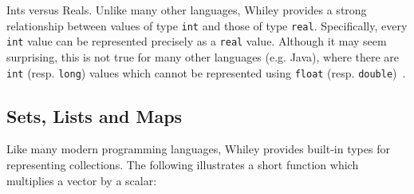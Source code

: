 \begin{insight}{Ints versus Reals.}
Unlike many other languages, Whiley provides a strong relationship
between values of type \lstinline{int} and those of type
\lstinline{real}.  Specifically, every \lstinline{int} value can be
represented precisely as a \lstinline{real} value.  Although it may
seem surprising, this is not true for many other languages
(e.g. Java), where there are \lstinline{int} (resp. \lstinline{long})
values which cannot be represented using \lstinline{float}
(resp. \lstinline{double})~\cite{GJSB05}.
\end{insight}


\newpage
\subsection{Sets, Lists and Maps}
\label{walkthrough_collections}
Like many modern programming languages, Whiley provides built-in types
for representing collections.  The following illustrates a short
function which multiplies a vector by a scalar:



